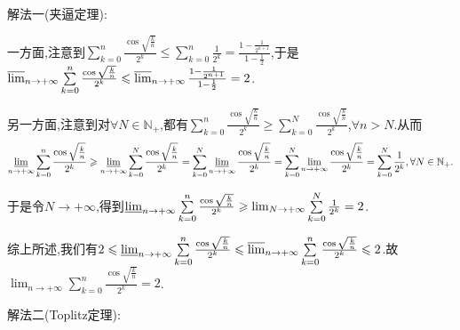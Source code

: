 \documentclass[lang=cn,newtx,10pt,scheme=chinese]{elegantbook}
\begin{document}
\begin{solution}
{\color{blue}解法一(夹逼定理):}

一方面,注意到\(\sum\limits_{k = 0}^{n}\frac{\cos\sqrt{\frac{k}{n}}}{2^k} \leqslant \sum\limits_{k = 0}^{n}\frac{1}{2^k} = \frac{1 - \frac{1}{2^{n + 1}}}{1 - \frac{1}{2}}\),于是
$\varlimsup_{n \to +\infty}\sum\limits_{k = 0}^{n}\frac{\cos\sqrt{\frac{k}{n}}}{2^k} \leqslant \varlimsup_{n \to +\infty}\frac{1 - \frac{1}{2^{n + 1}}}{1 - \frac{1}{2}} = 2$.

另一方面,注意到对\(\forall N \in \mathbb{N}_+\),都有\(\sum\limits_{k = 0}^{n}\frac{\cos\sqrt{\frac{k}{n}}}{2^k} \geqslant \sum\limits_{k = 0}^{N}\frac{\cos\sqrt{\frac{k}{n}}}{2^k}\),$\forall n>N$.从而
\begin{align*}
\varliminf_{n \to +\infty}\sum\limits_{k = 0}^{n}\frac{\cos\sqrt{\frac{k}{n}}}{2^k} \geqslant \varliminf_{n \to +\infty}\sum\limits_{k = 0}^{N}\frac{\cos\sqrt{\frac{k}{n}}}{2^k} = \sum\limits_{k = 0}^{N}\varliminf_{n \to +\infty}\frac{\cos\sqrt{\frac{k}{n}}}{2^k} = \sum\limits_{k = 0}^{N}\lim_{n \to +\infty}\frac{\cos\sqrt{\frac{k}{n}}}{2^k} = \sum\limits_{k = 0}^{N}\frac{1}{2^k},\forall N \in \mathbb{N}_+.
\end{align*}

于是令\(N \to +\infty\),得到\(\varliminf_{n \to +\infty}\sum\limits_{k = 0}^{n}\frac{\cos\sqrt{\frac{k}{n}}}{2^k} \geqslant \lim_{N \to +\infty}\sum\limits_{k = 0}^{N}\frac{1}{2^k} = 2\).

综上所述,我们有\(2 \leqslant \varliminf_{n \to +\infty}\sum\limits_{k = 0}^{n}\frac{\cos\sqrt{\frac{k}{n}}}{2^k} \leqslant \varlimsup_{n \to +\infty}\sum\limits_{k = 0}^{n}\frac{\cos\sqrt{\frac{k}{n}}}{2^k} \leqslant 2\).故\(\lim_{n \to +\infty}\sum\limits_{k = 0}^{n}\frac{\cos\sqrt{\frac{k}{n}}}{2^k} = 2\). 

{\color{blue}解法二(Toplitz定理):}
\end{solution}
\end{document}
